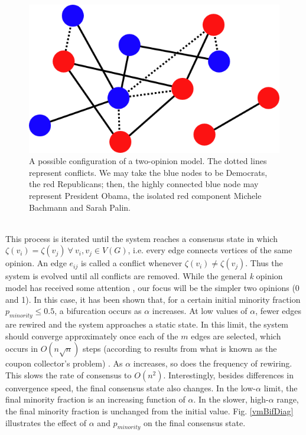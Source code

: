 \documentclass[11pt]{article}
\begin{document}
\begin{figure}[h!]
  \centering
  \includegraphics[width=.5\linewidth]{votingModel}
  \caption{A possible configuration of a two-opinion model. The dotted lines represent conflicts. We may take the blue nodes to be Democrats, the red Republicans; then, the highly connected blue node may represent President Obama, the isolated red component Michele Bachmann and Sarah Palin.}
  \label{fig:graphA}
\end{figure}
\\
This process is iterated until the system reaches a consensus state in which $\zeta(v_{i}) = \zeta(v_{j}) \ \forall \ v_{i}, v_{j} \in V(G)$, i.e. every edge connects vertices of the same opinion. An edge $e_{ij}$ is called a conflict whenever $\zeta(v_{i}) \ne \zeta(v_{j})$. Thus the system is evolved until all conflicts are removed. While the general \textit{k} opinion model has received some attention \cite{durretts preprint?}, our focus will be the simpler two opinions (0 and 1). In this case, it has been shown that, for a certain initial minority fraction $p_{minority} \le 0.5$, a bifurcation occurs as $\alpha$ increases. At low values of $\alpha$, fewer edges are rewired and the system approaches a static state. In this limit, the system should converge approximately once each of the $m$ edges are selected, which occurs in $O(n\sqrt{n})$ steps (according to results from what is known as the coupon collector's problem) \cite{durrett}. As $\alpha$ increases, so does the frequency of rewiring. This slows the rate of consensus to $O(n^{2})$. Interestingly, besides differences in convergence speed, the final consensus state also changes. In the low-$\alpha$ limit, the final minority fraction is an increasing function of $\alpha$. In the slower, high-$\alpha$ range, the final minority fraction is unchanged from the initial value. Fig. \ref{vmBifDiag} illustrates the effect of $\alpha$ and $p_{minority}$ on the final consensus state.\vspace{1mm}
\end{document}
